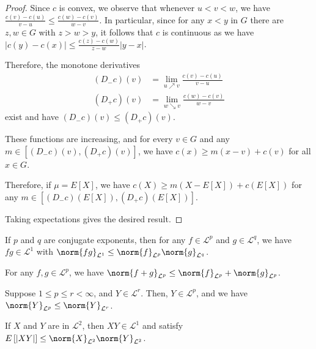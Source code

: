 \documentclass[10pt]{mypackage}
\begin{document}
\begin{proof}
  Since $c$ is convex, we observe that whenever $u < v < w$, we have $\frac{c(v)-c(u)}{v-u}\leq \frac{c(w)-c(v)}{w-v}$. In particular, since for any $x <y$ in $G$ there are $z,w\in G$ with $z >w > y$, it follows that $c$ is continuous as we have $\left\vert c(y)-c(x) \right\vert\leq \frac{c(z)-c(w)}{z-w}\left\vert y-x \right\vert$.

  Therefore, the monotone derivatives
  \begin{align*}
    \left( D_{-}c \right)(v) &= \lim_{u\nearrow v} \frac{c(v)-c(u)}{v-u}\\
    \left( D_{+}c \right)(v) &= \lim_{w\searrow v} \frac{c(w)-c(v)}{w-v}
  \end{align*}
  exist and have $\left( D_{-}c \right)(v) \leq \left( D_{+}c \right)(v)$.

  These functions are increasing, and for every $v\in G$ and any $m\in \left[ \left( D_{-}c \right)(v),\left( D_{+}c \right)(v) \right]$, we have $c(x)\geq m\left( x-v \right) + c(v)$ for all $x\in G$.

  Therefore, if $\mu = E\left[ X \right]$, we have $c(X)\geq m\left( X-E[X] \right) + c\left( E[X] \right)$ for any $m\in \left[ \left( D_{-}c \right)\left(E[X]\right),\left( D_{+}c \right)\left( E[X] \right) \right]$.

  Taking expectations gives the desired result.
\end{proof}
\begin{theorem}
  If $p$ and $q$ are conjugate exponents, then for any $f\in \mathcal{L}^p$ and $g\in \mathcal{L}^q$, we have $fg\in \mathcal{L}^1$ with $\norm{fg}_{\mathcal{L}^1}\leq \norm{f}_{\mathcal{L}^p}\norm{g}_{\mathcal{L}^q}$.
\end{theorem}
\begin{theorem}
  For any $f,g\in \mathcal{L}^p$, we have $\norm{f + g}_{\mathcal{L}^p}\leq \norm{f}_{\mathcal{L}^p} + \norm{g}_{\mathcal{L}^p}$.
\end{theorem}
\begin{theorem}
  Suppose $1\leq p \leq r < \infty$, and $Y\in \mathcal{L}^r$. Then, $Y\in \mathcal{L}^p$, and we have $\norm{Y}_{\mathcal{L}^p}\leq \norm{Y}_{\mathcal{L}^r}$.
\end{theorem}
\begin{theorem}
  If $X$ and $Y$ are in $\mathcal{L}^2$, then $XY\in \mathcal{L}^1$ and satisfy $E\left[ \left\vert XY \right\vert \right]\leq \norm{X}_{\mathcal{L}^2}\norm{Y}_{\mathcal{L}^2}$.
\end{theorem}
\end{document}
